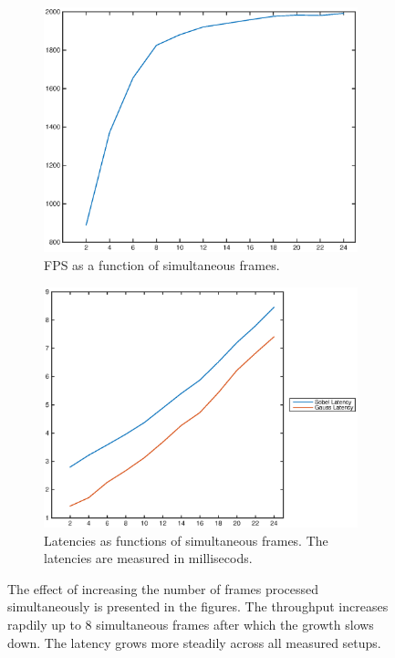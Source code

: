 \begin{figure}
    \centering
    \begin{subfigure}[t]{0.49\textwidth}
        \centering
        \includegraphics[width=0.99\linewidth]{images/simultaneous_frames_fps.eps}
        \caption{FPS as a function of simultaneous frames.}
        \label{fig:oeminitialframesfps}
    \end{subfigure}
    \begin{subfigure}[t]{0.49\textwidth}
        \centering
        \includegraphics[width=0.99\linewidth]{images/simultaneous_frames_latency.eps}
        \caption{Latencies as functions of simultaneous frames. The latencies are measured in millisecods.}
        \label{fig:oeminitialframeslat}
    \end{subfigure}
    \caption{The effect of increasing the number of frames processed simultaneously is presented in the figures. The throughput increases rapdily up to 8 simultaneous frames after which the growth slows down. The latency grows more steadily across all measured setups.}
\end{figure}

